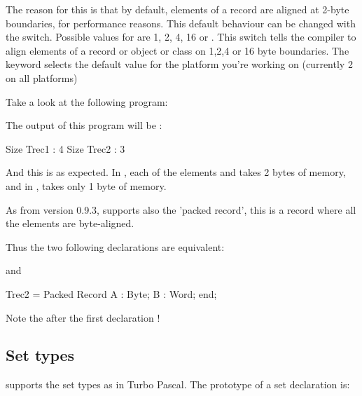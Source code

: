 \documentclass{report}
\begin{document}
The reason for this is that by default, elements of a record are aligned at
2-byte boundaries, for performance reasons. This default behaviour can be
changed with the  switch. Possible values for
 are 1, 2, 4, 16 or . 
This switch tells the compiler to align elements of a record or object or 
class on 1,2,4 or 16 byte boundaries. The keyword  selects the
default value for the platform you're working on (currently 2 on all
platforms)

Take a look at the following program:
The output of this program will be :
\begin{listing}
Size Trec1 : 4
Size Trec2 : 3
\end{listing}
And this is as expected. In , each of the elements  and
 takes 2 bytes of memory, and in  ,  takes only 1
byte of memory.

As from version 0.9.3, \fpc supports also the 'packed record', this is a 
record where all the elements are byte-aligned.

Thus the two following declarations are equivalent:
and
\begin{listing}
     Trec2 = Packed Record
       A : Byte;
       B : Word;
       end;
\end{listing}
Note the  after the first declaration !

\subsection{Set types}

\fpc supports the set types as in Turbo Pascal. The prototype of a set
declaration is: 
\end{document}
